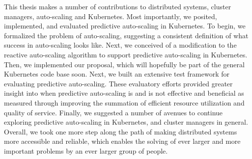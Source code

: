 This thesis makes a number of contributions to distributed systems, cluster
managers, auto-scaling and Kubernetes. Most importantly, we posited,
implemented, and evaluated predictive auto-scaling in Kubernetes. To begin, we
formalized the problem of auto-scaling, suggesting a consistent definition of
what success in auto-scaling looks like. Next, we conceived of a
modification to the reactive auto-scaling
algorithm to support predictive auto-scaling in Kubernetes. Then, we implemented
our proposal, which will hopefully be part of the general Kubernetes code base
soon. Next, we built an extensive test framework for evaluating predictive
auto-scaling. These evaluatory efforts provided greater insight into
when predictive auto-scaling is and is not
effective and beneficial as measured through improving the summation of
efficient resource utilization and quality of service.
Finally, we suggested a number of avenues to
continue exploring predictive auto-scaling in Kubernetes, and cluster managers
in general. Overall, we took one more step along the path of making distributed
systems more accessible and reliable, which enables the solving of ever larger
and more important problems by an ever larger group of people.
